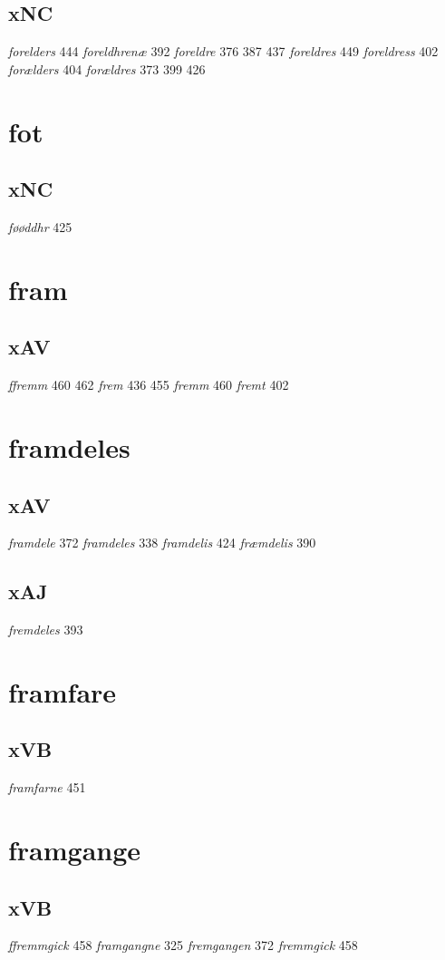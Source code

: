 \documentclass[a4paper,twocolumn]{article}
\begin{document}
\subsection{xNC}
\label{sec:org0e9a80b}
\emph{forelders} 444 \emph{foreldhrenæ} 392 \emph{foreldre} 376 387 437 \emph{foreldres} 449 \emph{foreldress} 402 \emph{forælders} 404 \emph{forældres} 373 399 426 
\section{fot}
\label{sec:org239adac}
\subsection{xNC}
\label{sec:org1126123}
\emph{føøddhr} 425 
\section{fram}
\label{sec:org6b8c950}
\subsection{xAV}
\label{sec:orgb38176b}
\emph{ffremm} 460 462 \emph{frem} 436 455 \emph{fremm} 460 \emph{fremt} 402 
\section{framdeles}
\label{sec:orgf03366f}
\subsection{xAV}
\label{sec:orgcba4438}
\emph{framdele} 372 \emph{framdeles} 338 \emph{framdelis} 424 \emph{fræmdelis} 390 
\subsection{xAJ}
\label{sec:orgdf167d1}
\emph{fremdeles} 393 
\section{framfare}
\label{sec:orgcbc99fc}
\subsection{xVB}
\label{sec:orgbd8cf70}
\emph{framfarne} 451 
\section{framgange}
\label{sec:orge8cdc3e}
\subsection{xVB}
\label{sec:orgf49f299}
\emph{ffremmgick} 458 \emph{framgangne} 325 \emph{fremgangen} 372 \emph{fremmgick} 458 
\end{document}
